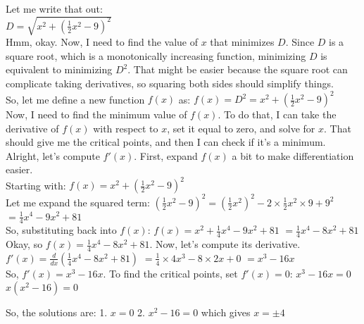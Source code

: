 \begin{abox}
Let me write that out:\\
$ D = \sqrt{x^2 + \left( \frac{1}{2}x^2 - 9 \right)^2 } $\\

Hmm, okay. Now, I need to find the value of $ x $ that minimizes $ D $. Since $ D $ is a square root, which is a monotonically increasing function, minimizing $ D $ is equivalent to minimizing $ D^2 $. That might be easier because the square root can complicate taking derivatives, so squaring both sides should simplify things.\\

So, let me define a new function $ f(x) $ as:
$ f(x) = D^2 = x^2 + \left( \frac{1}{2}x^2 - 9 \right)^2 $\\

Now, I need to find the minimum value of $ f(x) $. To do that, I can take the derivative of $ f(x) $ with respect to $ x $, set it equal to zero, and solve for $ x $. That should give me the critical points, and then I can check if it's a minimum.\\

Alright, let's compute $ f'(x) $. First, expand $ f(x) $ a bit to make differentiation easier.\\

Starting with:
$ f(x) = x^2 + \left( \frac{1}{2}x^2 - 9 \right)^2 $\\

Let me expand the squared term:
$ \left( \frac{1}{2}x^2 - 9 \right)^2 = \left( \frac{1}{2}x^2 \right)^2 - 2 \times \frac{1}{2}x^2 \times 9 + 9^2 $
$ = \frac{1}{4}x^4 - 9x^2 + 81 $\\

So, substituting back into $ f(x) $:
$ f(x) = x^2 + \frac{1}{4}x^4 - 9x^2 + 81 $
$ = \frac{1}{4}x^4 - 8x^2 + 81 $\\

Okay, so $ f(x) = \frac{1}{4}x^4 - 8x^2 + 81 $. Now, let's compute its derivative.\\

$ f'(x) = \frac{d}{dx}\left( \frac{1}{4}x^4 - 8x^2 + 81 \right) $
$ = \frac{1}{4} \times 4x^3 - 8 \times 2x + 0 $
$ = x^3 - 16x $\\

So, $ f'(x) = x^3 - 16x $. To find the critical points, set $ f'(x) = 0 $:
$ x^3 - 16x = 0 $
$ x(x^2 - 16) = 0 $


So, the solutions are:
1. $ x = 0 $
2. $ x^2 - 16 = 0 $ which gives $ x = \pm 4 $\\
\end{abox}
